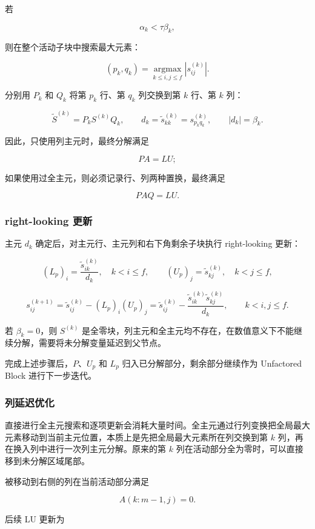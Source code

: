 若

\[
\alpha_k<\tau\beta_k,
\]

则在整个活动子块中搜索最大元素：

\[
(p_k,q_k)=\underset{k\le i,j\le f}{\operatorname{argmax}}
           \left|s_{ij}^{(k)}\right|.
\]

分别用 $P_k$ 和 $Q_k$ 将第 $p_k$ 行、第 $q_k$ 列交换到第 $k$ 行、第 $k$ 列：

\[
\widetilde S^{(k)}=P_kS^{(k)}Q_k,
\qquad
d_k=\widetilde s_{kk}^{(k)}=s_{p_kq_k}^{(k)},
\qquad
|d_k|=\beta_k.
\]

因此，只使用列主元时，最终分解满足

\[
PA=LU;
\]

如果使用过全主元，则必须记录行、列两种置换，最终满足

\[
PAQ=LU.
\]

\subsubsection{right-looking 更新}

主元 $d_k$ 确定后，对主元行、主元列和右下角剩余子块执行 right-looking 更新：

\[
(L_p)_i=\frac{\widetilde s_{ik}^{(k)}}{d_k},
\quad k<i\le f,
\qquad
(U_p)_j=\widetilde s_{kj}^{(k)},
\quad k<j\le f,
\]

\[
s_{ij}^{(k+1)}
=\widetilde s_{ij}^{(k)}-(L_p)_i(U_p)_j
=\widetilde s_{ij}^{(k)}
-\frac{\widetilde s_{ik}^{(k)}\widetilde s_{kj}^{(k)}}{d_k},
\qquad k<i,j\le f.
\]

若 $\beta_k=0$，则 $S^{(k)}$ 是全零块，列主元和全主元均不存在，在数值意义下不能继续分解，需要将未分解变量延迟到父节点。

完成上述步骤后，$P$、$U_p$ 和 $L_p$ 归入已分解部分，剩余部分继续作为 Unfactored Block 进行下一步迭代。

\subsubsection{列延迟优化}

直接进行全主元搜索和逐项更新会消耗大量时间。全主元通过行列变换把全局最大元素移动到当前主元位置，本质上是先把全局最大元素所在列交换到第 $k$ 列，再在换入列中进行一次列主元分解。原来的第 $k$ 列在活动部分全为零时，可以直接移到未分解区域尾部。

被移动到右侧的列在当前活动部分满足

\[
A(k:m-1,j)=0.
\]

后续 LU 更新为

